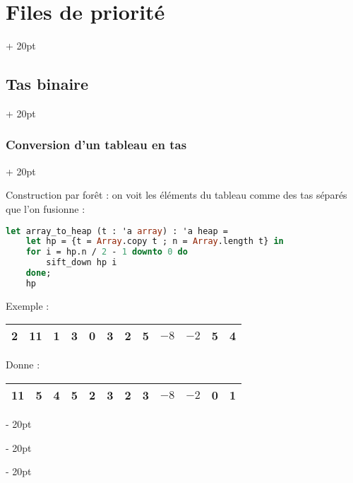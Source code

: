 \documentclass[a4paper, 12pt, twoside]{article}
\newcommand{\ind}[1][20pt]{\advance\leftskip + #1}
\newcommand{\deind}[1][20pt]{\advance\leftskip - #1}
\newenvironment{indt}[2][20pt]{#2 \par \ind[#1]}{\par \deind} %
\begin{document}
\begin{indt}{\section{Files de priorité}}
\begin{indt}{\subsection{Tas binaire}}
\begin{indt}{\subsubsection{Conversion d'un tableau en tas}}
                \vspace{12pt}
                
                Construction par forêt : on voit les éléments du tableau comme des tas séparés que l'on fusionne :
                \begin{lstlisting}[language=Caml, xleftmargin=80pt]
let array_to_heap (t : 'a array) : 'a heap =
    let hp = {t = Array.copy t ; n = Array.length t} in
    for i = hp.n / 2 - 1 downto 0 do
        sift_down hp i
    done;
    hp\end{lstlisting}
                
                Exemple :
                
                \begin{tabular}{|c|c|c|c|c|c|c|c|c|c|c|c|}
                    \hline
                    2 & 11 & 1 & 3 & 0 & 3 & 2 & 5 & $-8$ & $-2$ & 5 & 4
                    \\
                    \hline
                \end{tabular}
                
                \begin{center}
                \end{center}
                
                Donne :
                
                \begin{tabular}{|c|c|c|c|c|c|c|c|c|c|c|c|}
                    \hline
                    11 & 5 & 4 & 5 & 2 & 3 & 2 & 3 & $-8$ & $-2$ & 0 & 1
                    \\
                    \hline
                \end{tabular}
                

\end{indt}
\end{indt}
\end{indt}
\end{document}
